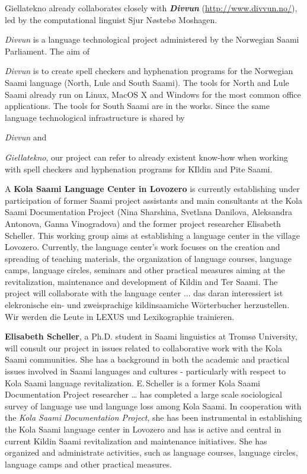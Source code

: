 \documentclass[a4paper,12pt]{article}
\begin{document}
Giellatekno already collaborates closely with \textit{\textbf{Divvun}} (\url{http://www.divvun.no/}), led by the computational linguist Sjur Nøstebø Moshagen. {\textit{Divvun} is a language technological project administered by the Norwegian Saami Parliament. The aim of {\textit{Divvun} is to create spell checkers and hyphenation programs for the Norwegian Saami language (North, Lule and South Saami). The tools for North and Lule Saami already run on Linux, MacOS X and Windows for the most common office applications. The tools for South Saami are in the works. Since the same language technological infrastructure is shared by {\textit{Divvun} and {\textit{Giellatekno}, our project can refer to already existent know-how when working with spell checkers and hyphenation programs for KIldin and Pite Saami.

A {\bf Kola Saami Language Center in Lovozero} is currently establishing under participation of former Saami project assistants and main consultants at the Kola Saami Documentation Project (Nina Sharshina, Svetlana Danilova, Aleksandra Antonova, Ganna Vinogradova) and the former project researcher Elisabeth Scheller. This working group aims at establishing a language center in the village Lovozero. 
Currently, the language center’s work focuses on the creation and spreading of teaching materials, the organization of language courses, language camps, language circles, seminars and other practical measures aiming at the revitalization, maintenance and development of Kildin and Ter Saami. The project will collaborate with the language center ... das daran interessiert ist elekronische ein- und zweisprachige kildinsaamiche Wörterbucher herzustellen. Wir werden die Leute in LEXUS und Lexikographie trainieren.

{\bf Elisabeth Scheller}, a Ph.D. student in Saami linguistics at Tromsø University, will consult our project in issues related to collaborative work with the Kola Saami communities. She has a background in both the academic and practical issues involved in Saami languages and cultures - particularly with respect to Kola Saami language revitalization. E.\,Scheller is a former Kola Saami Documentation Project researcher … has completed a large scale sociological survey of language use und language loss among Kola Saami. In cooperation with the {\it Kola Saami Documentation Project}, she has been instrumental in establishing the Kola Saami language center in Lovozero and has is active and central in current Kildin Saami revitalization and maintenance initiatives. She has organized and administrate activities, such as language courses, language circles, language camps and other practical measures.

}}}}
\end{document}
